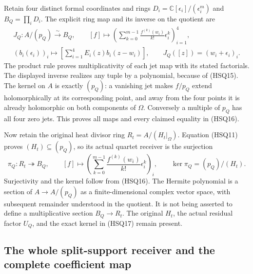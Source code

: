 Retain four distinct formal coordinates and rings
$D_i=\mathbb C[\epsilon_i]/(\epsilon_i^m)$ and $B_Q=\prod_iD_i$.
The explicit ring map and its inverse on the quotient are
\begin{equation}\tag{HSQ16}
 \begin{gathered}
 J_Q:A/(p_Q)\xrightarrow{\ \sim\ }B_Q,\qquad
 [f]\longmapsto
  \left(\sum_{k=0}^{m-1}\frac{f^{(k)}(w_i)}{k!}\epsilon_i^k\right)_{i=1}^4,\\
 (b_i(\epsilon_i))_i\longmapsto
        \left[\sum_{i=1}^4E_i(z)b_i(z-w_i)\right],\qquad
 J_Q([z])=(w_i+\epsilon_i)_i.
 \end{gathered}
\end{equation}
The product rule proves multiplicativity of each jet map with
its stated factorials. The displayed inverse realizes any tuple
by a polynomial, because of (HSQ15). The kernel on $A$ is exactly
$(p_Q)$: a vanishing jet makes $f/p_Q$ extend holomorphically
at its corresponding point, and away from the four points it is
already holomorphic on both components of $\Omega$. Conversely
a multiple of $p_Q$ has all four zero jets. This proves all maps
and every claimed equality in (HSQ16).

Now retain the original heat divisor ring $R_t=A/(H_t|_\Omega)$.
Equation (HSQ11) proves $(H_t)\subseteq(p_Q)$, so its actual
quartet receiver is the surjection
\begin{equation}\tag{HSQ17}
 \pi_Q:R_t\twoheadrightarrow B_Q,\qquad
 [f]\longmapsto\left(\sum_{k=0}^{m-1}
       \frac{f^{(k)}(w_i)}{k!}\epsilon_i^k\right)_i,
 \qquad \ker\pi_Q=(p_Q)/(H_t).
\end{equation}
Surjectivity and the kernel follow from (HSQ16). The Hermite
polynomial is a section of $A\to A/(p_Q)$ as a finite-dimensional
complex vector space, with subsequent remainder understood in
the quotient. It is not being asserted to define a multiplicative
section $B_Q\to R_t$. The original $H_t$, the actual residual
factor $U_Q$, and the exact kernel in (HSQ17) remain present.

\subsection{The whole split-support receiver and the complete coefficient map}

